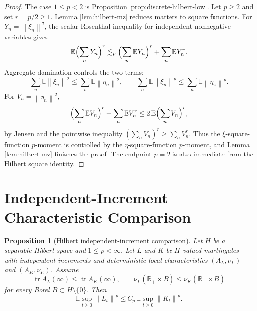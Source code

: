 \documentclass[11pt]{article}
\newtheorem{proposition}{Proposition}
\newcommand{\E}{\mathbb E}
\newcommand{\norm}[1]{\left\lVert #1\right\rVert}
\begin{document}
\begin{proof}
The case \(1\leq p<2\) is Proposition \ref{prop:discrete-hilbert-low}.  Let
\(p\geq2\) and set \(r=p/2\geq1\).  Lemma \ref{lem:hilbert-mz} reduces matters
to square functions.  For \(Y_n=\norm{\xi_n}^2\), the scalar Rosenthal
inequality for independent nonnegative variables gives
\[
  \E\Bigl(\sum_nY_n\Bigr)^r
  \lesssim_p
  \Bigl(\sum_n\E Y_n\Bigr)^r+\sum_n\E Y_n^r .
\]
Aggregate domination controls the two terms:
\[
   \sum_n\E\norm{\xi_n}^2\leq \sum_n\E\norm{\eta_n}^2,
   \qquad
   \sum_n\E\norm{\xi_n}^p\leq \sum_n\E\norm{\eta_n}^p.
\]
For \(V_n=\norm{\eta_n}^2\),
\[
  \Bigl(\sum_n\E V_n\Bigr)^r+\sum_n\E V_n^r
  \leq
  2\,\E\Bigl(\sum_nV_n\Bigr)^r,
\]
by Jensen and the pointwise inequality \((\sum_nV_n)^r\geq\sum_nV_n^r\).
Thus the \(\xi\)-square-function \(p\)-moment is controlled by the
\(\eta\)-square-function \(p\)-moment, and Lemma \ref{lem:hilbert-mz} finishes
the proof.  The endpoint \(p=2\) is also immediate from the Hilbert square
identity.
\end{proof}

\section*{Independent-Increment Characteristic Comparison}

\begin{proposition}[Hilbert independent-increment comparison]
\label{prop:ind-incr-hilbert}
Let \(H\) be a separable Hilbert space and \(1\leq p<\infty\).  Let \(L\) and
\(K\) be \(H\)-valued martingales with independent increments and deterministic
local characteristics \((A_L,\nu_L)\) and \((A_K,\nu_K)\).  Assume
\[
   \operatorname{tr} A_L(\infty)\leq \operatorname{tr} A_K(\infty),
   \qquad
   \nu_L(\mathbb R_+\times B)\leq \nu_K(\mathbb R_+\times B)
\]
for every Borel \(B\subset H\setminus\{0\}\).  Then
\[
   \E\sup_{t\geq0}\norm{L_t}^p
   \leq
   C_p\,\E\sup_{t\geq0}\norm{K_t}^p .
\]
\end{proposition}
\end{document}
